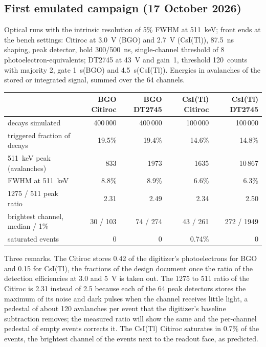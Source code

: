 \documentclass[11pt]{article}
\newcommand{\us}{\textmu s\xspace}
\newcommand{\csitl}{CsI(Tl)\xspace}
\begin{document}
\subsection*{First emulated campaign (17 October 2026)}

Optical runs with the intrinsic resolution of 5\% FWHM at 511~keV; front
ends at the bench settings: Citiroc at 3.0~V (BGO) and 2.7~V (\csitl),
87.5~ns shaping, peak detector, hold 300/500~ns, single-channel threshold of
8 photoelectron-equivalents; DT2745 at 43~V and gain~1, threshold 120~counts
with majority 2, gate 1~\us (BGO) and 4.5~\us (\csitl). Energies in
avalanches of the stored or integrated signal, summed over the 64 channels.

\begin{center}
\small
\begin{tabular}{l r r r r}
\toprule
 & BGO Citiroc & BGO DT2745 & \csitl Citiroc & \csitl DT2745 \\
\midrule
decays simulated & 400\,000 & 400\,000 & 100\,000 & 100\,000 \\
triggered fraction of decays & 19.5\% & 19.4\% & 14.6\% & 14.8\% \\
511~keV peak (avalanches) & 833 & 1973 & 1635 & 10\,867 \\
FWHM at 511~keV & 8.8\% & 8.9\% & 6.6\% & 6.3\% \\
1275 / 511 peak ratio & 2.31 & 2.49 & 2.34 & 2.50 \\
brightest channel, median / 1\% & 30 / 103 & 74 / 274 & 43 / 261 & 272 / 1949 \\
saturated events & 0 & 0 & 0.74\% & 0 \\
\bottomrule
\end{tabular}
\end{center}

Three remarks. The Citiroc stores 0.42 of the digitizer's photoelectrons
for BGO and 0.15 for \csitl, the fractions of the design document once the
ratio of the detection efficiencies at 3.0 and 5~V is taken out. The
1275 to 511 ratio of the Citiroc is 2.31 instead of 2.5 because each of
the 64 peak detectors stores the maximum of its noise and dark pulses when
the channel receives little light, a pedestal of about 120 avalanches per
event that the digitizer's baseline subtraction removes; the measured ratio
will show the same and the per-channel pedestal of empty events corrects
it. The \csitl Citiroc saturates in 0.7\% of the events, the brightest
channel of the events next to the readout face, as predicted.
\end{document}
